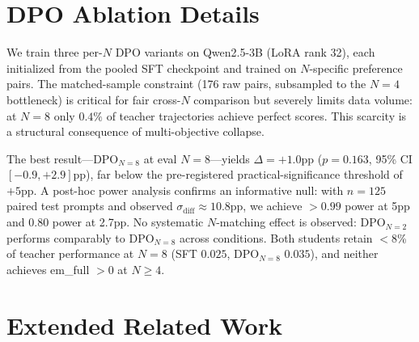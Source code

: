 \section{DPO Ablation Details}
\label{app:dpo}

We train three per-$N$ DPO variants on Qwen2.5-3B (LoRA rank 32), each initialized from the pooled SFT checkpoint and trained on $N$-specific preference pairs. The matched-sample constraint (176 raw pairs, subsampled to the $N\!=\!4$ bottleneck) is critical for fair cross-$N$ comparison but severely limits data volume: at $N\!=\!8$ only $0.4\%$ of teacher trajectories achieve perfect scores. This scarcity is a structural consequence of multi-objective collapse.

\begin{table}[h]
\centering
\small
{}
\caption{Full em\_partial evaluation matrix ($\text{max\_new\_tokens}=4096$). Best $N\!=\!8$ DPO: $+1.0$pp ($p=0.163$).}
\label{tab:eval_matrix}
\end{table}

The best result---DPO$_{N=8}$ at eval $N\!=\!8$---yields $\Delta = +1.0$pp ($p=0.163$, 95\% CI $[-0.9, +2.9]$pp), far below the pre-registered practical-significance threshold of $+5$pp. A post-hoc power analysis confirms an informative null: with $n=125$ paired test prompts and observed $\sigma_{\text{diff}} \approx 10.8$pp, we achieve $>0.99$ power at 5pp and $0.80$ power at 2.7pp. No systematic $N$-matching effect is observed: DPO$_{N=2}$ performs comparably to DPO$_{N=8}$ across conditions. Both students retain $<$8\% of teacher performance at $N\!=\!8$ (SFT $0.025$, DPO$_{N=8}$ $0.035$), and neither achieves em\_full $> 0$ at $N \geq 4$.

\section{Extended Related Work}
\label{app:extended_related}


